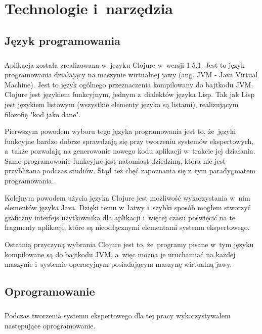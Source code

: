 \chapter{Technologie i~narzędzia}\label{chap:narzedzia}

\section{Język programowania}

\paragraph{}
Aplikacja została zrealizowana w~języku Clojure\cite{clj} w~wersji 1.5.1. Jest to język programowania działający na maszynie wirtualnej jawy (ang. JVM - Java Virtual Machine). Jest to język ogólnego przeznaczenia kompilowany do bajtkodu JVM. Clojure jest językiem funkcyjnym, jednym z~dialektów języka Lisp. Tak jak Lisp jest językiem listowym (wszystkie elementy języka są listami), realizującym filozofię "kod jako dane".

Pierwszym powodem wyboru tego języka programowania jest to, że~języki funkcyjne bardzo dobrze sprawdzają się przy tworzeniu systemów ekspertowych, a~także pozwalają na generowanie nowego kodu aplikacji w~trakcie jej działania. Samo programowanie funkcyjne jest natomiast dziedziną, która nie jest przybliżana podczas studiów. Stąd też chęć zapoznania się z~tym paradygmatem programowania.

Kolejnym powodem użycia języka Clojure jest możliwość wykorzystania w~nim elementów języka Java\cite{java}. Dzięki temu w~łatwy i~szybki sposób mogłem stworzyć graficzny interfejs użytkownika dla aplikacji i~więcej czasu poświęcić na te fragmenty aplikacji, które są nieodłącznymi elementami systemu ekspertowego.

Ostatnią przyczyną wybrania Clojure jest to, że~programy pisane w~tym języku kompilowane są do bajtkodu JVM, a~więc można je uruchamiać na każdej maszynie i~systemie operacyjnym posiadającym maszynę wirtualną jawy.

\section{Oprogramowanie}

\paragraph{}
Podczas tworzenia systemu ekspertowego dla tej pracy wykorzystywałem następujące oprogramowanie.


